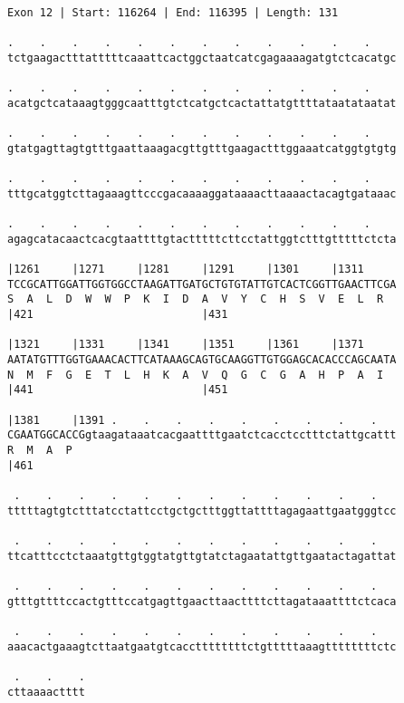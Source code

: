 \documentclass{article}
\begin{document}
\begin{Verbatim}
Exon 12 | Start: 116264 | End: 116395 | Length: 131
 
.    .    .    .    .    .    .    .    .    .    .    .    
tctgaagactttatttttcaaattcactggctaatcatcgagaaaagatgtctcacatgc
  
.    .    .    .    .    .    .    .    .    .    .    .    
acatgctcataaagtgggcaatttgtctcatgctcactattatgttttataatataatat
  
.    .    .    .    .    .    .    .    .    .    .    .    
gtatgagttagtgtttgaattaaagacgttgtttgaagactttggaaatcatggtgtgtg
  
.    .    .    .    .    .    .    .    .    .    .    .    
tttgcatggtcttagaaagttcccgacaaaaggataaaacttaaaactacagtgataaac
  
.    .    .    .    .    .    .    .    .    .    .    .    
agagcatacaactcacgtaattttgtactttttcttcctattggtctttgtttttctcta
  
|1261     |1271     |1281     |1291     |1301     |1311     
TCCGCATTGGATTGGTGGCCTAAGATTGATGCTGTGTATTGTCACTCGGTTGAACTTCGA
S  A  L  D  W  W  P  K  I  D  A  V  Y  C  H  S  V  E  L  R  
|421                          |431                          
  
|1321     |1331     |1341     |1351     |1361     |1371     
AATATGTTTGGTGAAACACTTCATAAAGCAGTGCAAGGTTGTGGAGCACACCCAGCAATA
N  M  F  G  E  T  L  H  K  A  V  Q  G  C  G  A  H  P  A  I  
|441                          |451                          
  
|1381     |1391 .    .    .    .    .    .    .    .    .   
CGAATGGCACCGgtaagataaatcacgaattttgaatctcacctcctttctattgcattt
R  M  A  P                                                  
|461                                                        
  
 .    .    .    .    .    .    .    .    .    .    .    .   
tttttagtgtctttatcctattcctgctgctttggttattttagagaattgaatgggtcc
  
 .    .    .    .    .    .    .    .    .    .    .    .   
ttcatttcctctaaatgttgtggtatgttgtatctagaatattgttgaatactagattat
  
 .    .    .    .    .    .    .    .    .    .    .    .   
gtttgttttccactgtttccatgagttgaacttaacttttcttagataaattttctcaca
  
 .    .    .    .    .    .    .    .    .    .    .    .   
aaacactgaaagtcttaatgaatgtcaccttttttttctgtttttaaagttttttttctc
  
 .    .    .
cttaaaactttt
\end{Verbatim}
\newpage
\end{document}

